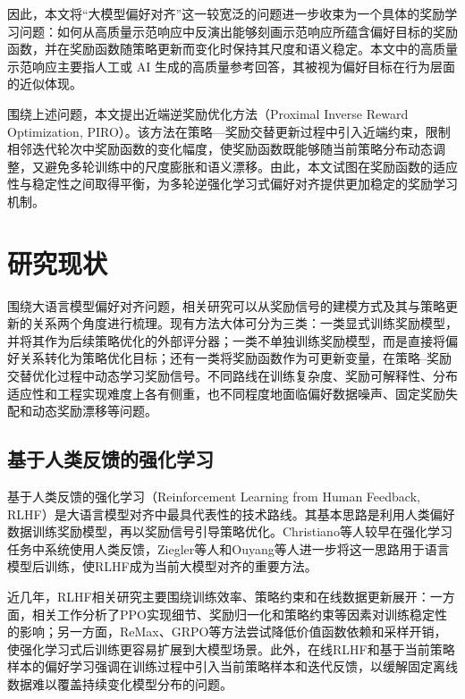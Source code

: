 因此，本文将“大模型偏好对齐”这一较宽泛的问题进一步收束为一个具体的奖励学习问题：如何从高质量示范响应中反演出能够刻画示范响应所蕴含偏好目标的奖励函数，并在奖励函数随策略更新而变化时保持其尺度和语义稳定。本文中的高质量示范响应主要指人工或 AI 生成的高质量参考回答，其被视为偏好目标在行为层面的近似体现。

围绕上述问题，本文提出近端逆奖励优化方法（Proximal Inverse Reward Optimization, PIRO）。该方法在策略—奖励交替更新过程中引入近端约束，限制相邻迭代轮次中奖励函数的变化幅度，使奖励函数既能够随当前策略分布动态调整，又避免多轮训练中的尺度膨胀和语义漂移。由此，本文试图在奖励函数的适应性与稳定性之间取得平衡，为多轮逆强化学习式偏好对齐提供更加稳定的奖励学习机制。

\section{研究现状}

围绕大语言模型偏好对齐问题，相关研究可以从奖励信号的建模方式及其与策略更新的关系两个角度进行梳理。现有方法大体可分为三类：一类显式训练奖励模型，并将其作为后续策略优化的外部评分器；一类不单独训练奖励模型，而是直接将偏好关系转化为策略优化目标；还有一类将奖励函数作为可更新变量，在策略--奖励交替优化过程中动态学习奖励信号。不同路线在训练复杂度、奖励可解释性、分布适应性和工程实现难度上各有侧重，也不同程度地面临偏好数据噪声、固定奖励失配和动态奖励漂移等问题。

\subsection{基于人类反馈的强化学习}

基于人类反馈的强化学习（Reinforcement Learning from Human Feedback, RLHF）是大语言模型对齐中最具代表性的技术路线。其基本思路是利用人类偏好数据训练奖励模型，再以奖励信号引导策略优化。Christiano等人\cite{christiano2017deep}较早在强化学习任务中系统使用人类反馈，Ziegler等人\cite{ziegler2019fine}和Ouyang等人\cite{ouyang2022training}进一步将这一思路用于语言模型后训练，使RLHF成为当前大模型对齐的重要方法。

近几年，RLHF相关研究主要围绕训练效率、策略约束和在线数据更新展开：一方面，相关工作分析了PPO实现细节、奖励归一化和策略约束等因素对训练稳定性的影响\cite{zheng2023secrets,moskovitz2023fool}；另一方面，ReMax、GRPO等方法尝试降低价值函数依赖和采样开销，使强化学习式后训练更容易扩展到大模型场景\cite{li2023reward,shao2024deepseekmath}。此外，在线RLHF和基于当前策略样本的偏好学习强调在训练过程中引入当前策略样本和迭代反馈，以缓解固定离线数据难以覆盖持续变化模型分布的问题\cite{tajwar2024preference,online_rlhf_2025}。

